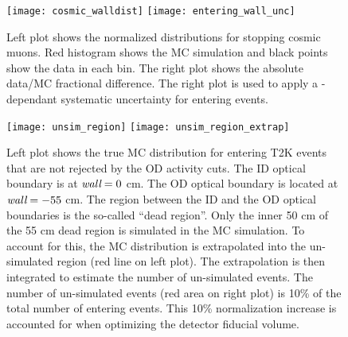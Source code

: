 \begin{figure}[h!t]
  \begin{center}
    \texttt{[image: cosmic\_walldist]}
    \texttt{[image: entering\_wall\_unc]}
  \end{center}
  \caption{Left plot shows the normalized \wall distributions for stopping cosmic muons.  Red histogram
  shows the MC simulation and black points show the data in each bin.  The right plot shows the absolute 
  data/MC fractional difference.  The right plot is used to apply a \wall-dependant systematic uncertainty
  for entering events.}
  \label{fig:enteringwall}
\end{figure}

\begin{figure}[h!t]
  \begin{center}
    \texttt{[image: unsim\_region]}
    \texttt{[image: unsim\_region\_extrap]}
  \end{center}
  \caption{Left plot shows the true MC \wall distribution for entering T2K
  events that are not rejected by the OD activity cuts.  The ID optical
  boundary is at $\emph{wall} = 0$ cm.  The OD optical boundary is located at  $\emph{wall}
  = -55$ cm. The region between the ID and the OD optical boundaries is the
  so-called ``dead region''.  Only the inner 50 cm of the 55 cm dead region is
  simulated in the MC simulation.  To account for this, the MC distribution is
  extrapolated into the un-simulated region (red line on left plot).  The
  extrapolation is then integrated to estimate the number of un-simulated
  events.  The number of un-simulated events (red area on right plot) is 10\%
  of the total number of entering events. This 10\% normalization increase is
  accounted for when optimizing the detector fiducial volume.}
  \label{fig:unsim}
\end{figure}







